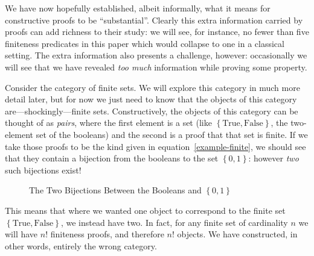 We have now hopefully established, albeit informally, what it means for
constructive proofs to be ``substantial''.
Clearly this extra information carried by proofs can add richness to their
study: we will see, for instance, no fewer than five finiteness predicates in
this paper which would collapse to one in a classical setting.
The extra information also presents a challenge, however: occasionally we will
see that we have revealed \emph{too much} information while proving some
property.

Consider the category of finite sets.
We will explore this category in much more detail later, but for now we just
need to know that the objects of this category are---shockingly---finite sets.
Constructively, the objects of this category can be thought of as \emph{pairs},
where the first element is a set (like \(\left\{ \text{True}, \text{False}
\right\}\), the two-element set of the booleans) and the second is a proof that
that set is finite.
If we take those proofs to be the kind given in equation~\ref{example-finite},
we should see that they contain a bijection from the booleans to the set
\(\left\{ 0, 1 \right\}\): however \emph{two} such bijections exist!
\begin{figure}[h]
  \centering
  \begin{subfigure}[b]{.45\textwidth}
    \centering
  \end{subfigure}
  \begin{subfigure}[b]{.45\textwidth}
    \centering
  \end{subfigure}
  \caption{The Two Bijections Between the Booleans and \(\left\{ 0, 1 \right\}\)}
\end{figure}
This means that where we wanted one object to correspond to the finite set
\(\left\{ \text{True}, \text{False} \right\}\), we instead have two.
In fact, for any finite set of cardinality \(n\) we will have \(n!\) finiteness
proofs, and therefore \(n!\) objects.
We have constructed, in other words, entirely the wrong category.


